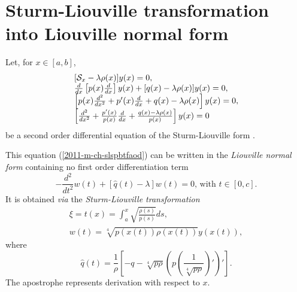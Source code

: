 \section{Sturm-Liouville transformation into Liouville normal form}
 Let, for $x\in [a,b]$,
\begin{equation}
\begin{array}  {l}
[{\cal S}_x  -\lambda \rho (x)] y(x)=0,\\
\frac{d}{dx}\left[ p(x) \frac{d}{dx}\right] y(x) + [q(x) -\lambda \rho (x)]y(x)=0,\\
\left[p(x)\frac{d^2 }{dx^2} + p'(x) \frac{d}{dx} + q(x) -\lambda \rho (x)\right] y(x)=0,\\
\left[\frac{d^2 }{dx^2} + \frac{p'(x)}{p(x)} \frac{d}{dx} + \frac{q(x) -\lambda \rho (x)}{p(x)}\right] y(x)=0
\end{array}
\label{2011-m-ch-slspbtfaod}
\end{equation}
be a second order differential equation of the
Sturm-Liouville form
 \cite{birkhoff-Rota-48}.

This equation (\ref{2011-m-ch-slspbtfaod}) can be written in the
{\em Liouville normal form}
 containing no first order differentiation term
\begin{equation}
-\frac{d^2}{dt^2} w(t) + [\hat{q}(t) -\lambda ] w(t)=0  \textrm{, with }t\in [0,c] .
\label{2011-m-ch-slspbtfaolnf}
\end{equation}
It is obtained {\em via} the
{\em Sturm-Liouville transformation}
\begin{equation}
\begin{array}  {l}
\xi= t(x) =   \int_a^x \sqrt{\frac{\rho(s)}{p(s)}}  ds,   \\
w(t)= \sqrt[4]{p(x(t))\rho(x(t))} y (x(t)),
\end{array}
\end{equation}
where
\begin{equation}
\hat{q}(t)= \frac{1}{\rho }\left[-q -\sqrt[4]{p\rho }
\left(p\left( \frac{1}{\sqrt[4]{p\rho }}\right)'\right)'\right].
\end{equation}
The apostrophe represents derivation with respect to $x$.

